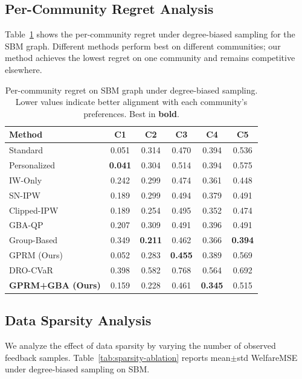 \documentclass{article}
\theoremstyle{plain}
\theoremstyle{definition}
\theoremstyle{remark}
\begin{document}

\subsection{Per-Community Regret Analysis}
\label{app:community-regret}

Table~\ref{tab:community-regret} shows the per-community regret under
degree-biased sampling for the SBM graph. Different methods perform best on
different communities; our method achieves the lowest regret on one community
and remains competitive elsewhere.


\begin{table}[h]
\caption{Per-community regret on SBM graph under degree-biased sampling. Lower
values indicate better alignment with each community's preferences. Best in
\textbf{bold}.}
\label{tab:community-regret}
\centering
\small
\begin{tabular}{lccccc}
\toprule
\textbf{Method} & \textbf{C1} & \textbf{C2} & \textbf{C3} & \textbf{C4} & \textbf{C5} \\
\midrule
Standard & 0.051 & 0.314 & 0.470 & 0.394 & 0.536 \\
Personalized & \textbf{0.041} & 0.304 & 0.514 & 0.394 & 0.575 \\
IW-Only & 0.242 & 0.299 & 0.474 & 0.361 & 0.448 \\
SN-IPW & 0.189 & 0.299 & 0.494 & 0.379 & 0.491 \\
Clipped-IPW & 0.189 & 0.254 & 0.495 & 0.352 & 0.474 \\
GBA-QP & 0.207 & 0.309 & 0.491 & 0.396 & 0.491 \\
Group-Based & 0.349 & \textbf{0.211} & 0.462 & 0.366 & \textbf{0.394} \\
GPRM (Ours) & 0.052 & 0.283 & \textbf{0.455} & 0.389 & 0.569 \\
DRO-CVaR & 0.398 & 0.582 & 0.768 & 0.564 & 0.692 \\
\textbf{GPRM+GBA (Ours)} & 0.159 & 0.228 & 0.461 & \textbf{0.345} & 0.515 \\
\bottomrule
\end{tabular}
\end{table}

\subsection{Data Sparsity Analysis}
\label{app:sparsity}

We analyze the effect of data sparsity by varying the number of observed feedback
samples. Table~\ref{tab:sparsity-ablation} reports mean$\pm$std WelfareMSE under
degree-biased sampling on SBM.
\end{document}
